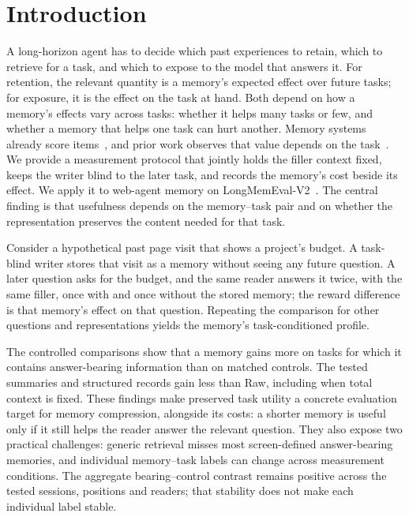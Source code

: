 \section{Introduction}

A long-horizon agent has to decide which past experiences to retain, which to
retrieve for a task, and which to expose to the model that answers it. For
retention, the relevant quantity is a memory's expected effect over future
tasks; for exposure, it is the effect on the task at hand. Both depend on how a
memory's effects vary across tasks: whether it helps many tasks or few, and
whether a memory that helps one task can hurt another. Memory systems already score items~\cite{multifactor,memoryrone,umem}, and prior
work observes that value depends on the task~\cite{ember,evomemeval,meclear}. We provide a measurement protocol that jointly holds the filler context
fixed, keeps the writer blind to the later task, and records the memory's
cost beside its effect. We apply it to web-agent memory on
LongMemEval-V2~\cite{lmev2}. The central finding is that usefulness depends
on the memory--task pair and on whether the representation preserves the
content needed for that task.

Consider a hypothetical past page visit that shows a project's budget. A
task-blind writer stores that visit as a memory without seeing any future
question. A later question asks for the budget, and the same reader answers it
twice, with the same filler, once with and once without the stored memory; the
reward difference is that memory's effect on that question. Repeating the
comparison for other questions and representations yields the memory's
task-conditioned profile.

The controlled comparisons show that a memory gains more on tasks for
which it contains answer-bearing information than on matched controls.
The tested summaries and structured records gain less than Raw, including
when total context is fixed. These findings make preserved task utility a concrete evaluation target
for memory compression, alongside its costs: a shorter memory is useful
only if it still helps the reader answer the relevant question. They also expose two
practical challenges: generic retrieval misses most screen-defined
answer-bearing memories, and individual memory--task labels can change
across measurement conditions. The aggregate bearing--control contrast
remains positive across the tested sessions, positions and readers;
that stability does not make each individual label stable.

